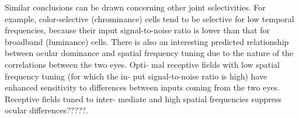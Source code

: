 \begin{exm}
  Similar conclusions can be drawn concerning other joint selectivities. For
example, color-selective (chrominance) cells tend to be selective for low
temporal frequencies, because their input signal-to-noise ratio is lower
than that for broadband (luminance) cells. There is also an interesting
predicted relationship between ocular dominance and spatial frequency
tuning due to the nature of the correlations between the two eyes. Opti-
mal receptive fields with low spatial frequency tuning (for which the in-
put signal-to-noise ratio is high) have enhanced sensitivity to differences
between inputs coming from the two eyes. Receptive fields tuned to inter-
mediate and high spatial frequencies suppress ocular differences?????.
\end{exm}
